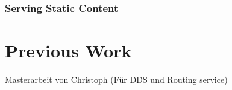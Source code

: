 \subsection{Serving Static Content}

		
\chapter{Previous Work}

Masterarbeit von Christoph (Für DDS und Routing service)